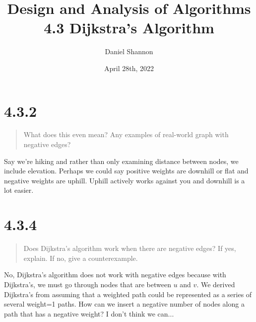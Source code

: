 \documentclass[12pt, letterpaper, twoside]{article}
\title{%
Design and Analysis of Algorithms\\
\large 4.3 Dijkstra's Algorithm
}
\author{Daniel Shannon}
\date{April 28th, 2022}
\begin{document}
\begin{titlepage}
\maketitle
\end{titlepage}

\section*{4.3.2}

\begin{quote}
What does this even mean? Any examples of real-world graph with negative edges?
\end{quote}

Say we're hiking and rather than only examining distance between nodes, we include elevation. 
Perhaps we could say positive weights are downhill or flat and negative weights are uphill.
Uphill actively works against you and downhill is a lot easier.

\section*{4.3.4}

\begin{quote}
Does Dijkstra's algorithm work when there are negative edges? If yes, explain. If no, give a counterexample.
\end{quote}

No, Dijkstra's algorithm does not work with negative edges because with Dijkstra's, we 
must go through nodes that are between $u$ and $v$. We derived Dijkstra's from assuming that 
a weighted path could be represented as a series of several weight=1 paths. How can we insert a negative number 
of nodes along a path that has a negative weight? I don't think we can...
\end{document}
